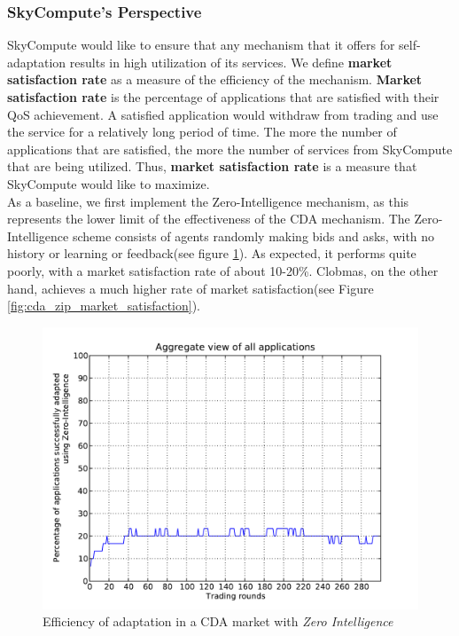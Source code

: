 \documentclass[10pt,journal,compsoc]{IEEEtran}
\begin{document}
\subsubsection{SkyCompute's Perspective}	
SkyCompute would like to ensure that any mechanism that it offers for self-adaptation results in high utilization of its services. We define \textbf{market satisfaction rate} as a measure of the efficiency of the mechanism. \textbf{Market satisfaction rate} is the percentage of applications that are satisfied with their QoS achievement. A satisfied application would withdraw from trading and use the service for a relatively long period of time. The more the number of applications that are satisfied, the more the number of services from SkyCompute that are being utilized. Thus, \textbf{market satisfaction rate} is a measure that SkyCompute would like to maximize.\\
As a baseline, we first implement the Zero-Intelligence mechanism, as this represents the lower limit of the effectiveness of the CDA mechanism. The Zero-Intelligence scheme consists of agents randomly making bids and asks, with no history or learning or feedback(see figure \ref{fig:cda_zi_market_satisfaction}). As expected, it performs quite poorly, with a market satisfaction rate of about 10-20\%. Clobmas, on the other hand, achieves a much higher rate of market satisfaction(see Figure \ref{fig:cda_zip_market_satisfaction}). 

\begin{figure}[h]
	\centering
    \includegraphics[scale=0.45, clip, trim=0cm 1cm 1cm 0.8cm]{graphs/efficiency-of-zi.pdf}
    \caption{Efficiency of adaptation in a CDA market with \textit{Zero Intelligence}\label{fig:cda_zi_market_satisfaction}}
\end{figure}
\end{document}
